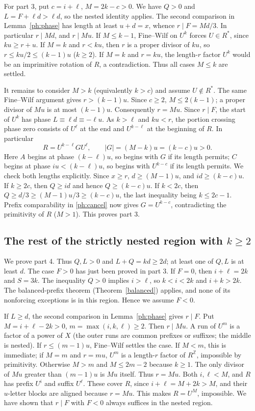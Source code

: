 For part 3, put $c=i+\ell$, $M=2k-c>0$. We have $Q>0$ and
$L=F+\ell d>\ell d$, so the nested identity applies. The second
comparison in Lemma~\ref{ph:phase} has length at least $u+d=x$,
whence $r\mid F=Md/3$. In particular $r\mid Md$, and $r\mid Mu$.
If $M\le k-1$, Fine--Wilf on $U^k$ forces $U\in R^*$, since
$ku\ge r+u$. If $M=k$ and $r<ku$, then $r$ is a proper divisor
of $ku$, so $r\le ku/2\le(k-1)u$ ($k\ge2$). If $M=k$ and $r=ku$,
the length-$r$ factor $U^k$ would be an imprimitive rotation of $R$,
a contradiction. Thus all cases $M\le k$ are settled.

It remains to consider $M>k$ (equivalently $k>c$) and assume
$U\notin R^*$. The same Fine--Wilf argument gives $r>(k-1)u$.
Since $c\ge2$, $M\le2(k-1)$; a proper divisor of $Mu$ is at most
$(k-1)u$. Consequently $r=Mu$. Since $r\mid F$, the start of
$U^k$ has phase $L\equiv\ell d\equiv-\ell u$. As $k>\ell$ and
$ku<r$, the portion crossing phase zero consists of $U^\ell$ at the
end and $U^{k-\ell}$ at the beginning of $R$. In particular
\[
 R=U^{k-\ell}G U^\ell,
 \qquad |G|=(M-k)u=(k-c)u>0.
\]
Here $A$ begins at phase $(k-\ell)u$, so begins with $G$ if its
length permits; $C$ begins at phase $iu<(k-\ell)u$, so begins with
$U^{k-c}$ if its length permits. We check both lengths explicitly.
Since $x\ge r$, $d\ge(M-1)u$, and $id\ge(k-c)u$. If $k\ge2c$,
then $Q\ge id$ and hence $Q\ge(k-c)u$. If $k<2c$, then
$Q\ge d/3\ge(M-1)u/3\ge(k-c)u$, the last inequality being
$k\le2c-1$. Prefix comparability in \eqref{ph:cancel} now gives
$G=U^{k-c}$, contradicting the primitivity of $R$ ($M>1$).
This proves part 3.

\subsection{The rest of the strictly nested region with $k\ge2$}
We prove part 4. Thus $Q,L>0$ and $L+Q=kd\ge2d$; at least one of
$Q,L$ is at least $d$. The case $F>0$ has just been proved in part 3.
If $F=0$, then $i+\ell=2k$ and $S=3k$. The inequality $Q>0$ implies
$i>\ell$, so $k<i<2k$ and $i+k>2k$. The balanced-prefix theorem
(Theorem~\ref{balanced}) applies, and none of its nonforcing exceptions
is in this region. Hence we assume $F<0$.

If $L\ge d$, the second comparison in Lemma~\ref{ph:phase} gives
$r\mid F$. Put $M=i+\ell-2k>0$, $m=\max(i,k,\ell)\ge2$. Then
$r\mid Mu$. A run of $U^m$ is a factor of a power of $X$ (the outer
runs are common prefixes or suffixes; the middle is nested).
If $r\le(m-1)u$, Fine--Wilf settles the case. If $M<m$, this is
immediate; if $M=m$ and $r=mu$, $U^m$ is a length-$r$ factor of
$R^{\mathbb Z}$, impossible by primitivity. Otherwise $M>m$ and
$M\le2m-2$ because $k\ge1$. The only divisor of $Mu$ greater than
$(m-1)u$ is $Mu$ itself. Thus $r=Mu$. Both $i,\ell<M$, and $R$
has prefix $U^i$ and suffix $U^\ell$. These cover $R$, since
$i+\ell=M+2k>M$, and their $u$-letter blocks are aligned because
$r=Mu$. This makes $R=U^M$, impossible. We have shown that $r\mid F$
with $F<0$ always suffices in the nested region.

